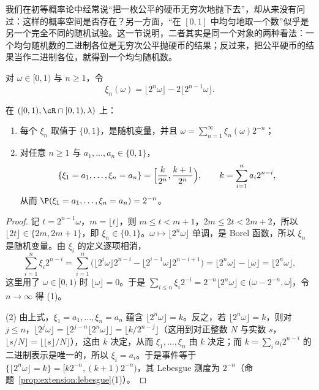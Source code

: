 我们在初等概率论中经常说“把一枚公平的硬币无穷次地抛下去”，却从来没有问过：这样的概率空间是否存在？另一方面，“在 $[0,1]$ 中均匀地取一个数”似乎是另一个完全不同的随机试验。这一节说明，二者其实是同一个对象的两种看法：一个均匀随机数的二进制各位是无穷次公平抛硬币的结果；反过来，把公平硬币的结果当作二进制各位，就得到一个均匀随机数。

对 $\omega\in[0,1)$ 与 $n\geqslant1$，令
\[
\xi_n(\omega)=\lfloor2^n\omega\rfloor-2\lfloor2^{n-1}\omega\rfloor .
\]

\begin{proposition}[均匀随机数的二进制各位]\label{prop:distributions:binary-digits}
在 $([0,1),\cR\cap[0,1),\lambda)$ 上：
\begin{enumerate}
\item 每个 $\xi_n$ 取值于 $\{0,1\}$，是随机变量，并且 $\omega=\sum_{n=1}^\infty\xi_n(\omega)2^{-n}$；
\item 对任意 $n\geqslant1$ 与 $a_1,\dots,a_n\in\{0,1\}$，
\[
\{\xi_1=a_1,\dots,\xi_n=a_n\}=\Bigl[\frac k{2^n},\frac{k+1}{2^n}\Bigr),\qquad k=\sum_{i=1}^na_i2^{n-i},
\]
从而 $\P(\xi_1=a_1,\dots,\xi_n=a_n)=2^{-n}$。
\end{enumerate}
\end{proposition}
\begin{proof}
记 $t=2^{n-1}\omega$，$m=\lfloor t\rfloor$，则 $m\leqslant t<m+1$，$2m\leqslant2t<2m+2$，所以 $\lfloor2t\rfloor\in\{2m,2m+1\}$，即 $\xi_n\in\{0,1\}$。$\omega\mapsto\lfloor2^n\omega\rfloor$ 单调，是 Borel 函数，所以 $\xi_n$ 是随机变量。由 $\xi_i$ 的定义逐项相消，
\[
\sum_{i=1}^n\xi_i2^{n-i}=\sum_{i=1}^n\bigl(\lfloor2^i\omega\rfloor2^{n-i}-\lfloor2^{i-1}\omega\rfloor2^{n-i+1}\bigr)=\lfloor2^n\omega\rfloor-\lfloor\omega\rfloor=\lfloor2^n\omega\rfloor,
\]
这里用了 $\omega\in[0,1)$ 时 $\lfloor\omega\rfloor=0$。于是 $\sum_{i\leqslant n}\xi_i2^{-i}=2^{-n}\lfloor2^n\omega\rfloor\in(\omega-2^{-n},\omega]$，令 $n\to\infty$ 得 (1)。

(2) 由上式，$\xi_1=a_1,\dots,\xi_n=a_n$ 蕴含 $\lfloor2^n\omega\rfloor=k$。反之，若 $\lfloor2^n\omega\rfloor=k$，则对 $j\leqslant n$，$\lfloor2^j\omega\rfloor=\lfloor2^{j-n}\lfloor2^n\omega\rfloor\rfloor=\lfloor k/2^{n-j}\rfloor$（这用到对正整数 $N$ 与实数 $s$，$\lfloor s/N\rfloor=\lfloor\lfloor s\rfloor/N\rfloor$），这由 $k$ 决定，从而 $\xi_1,\dots,\xi_n$ 由 $k$ 决定；而 $k=\sum_ia_i2^{n-i}$ 的二进制表示是唯一的，所以 $\xi_i=a_i$。于是事件等于 $\{\lfloor2^n\omega\rfloor=k\}=[k2^{-n},(k+1)2^{-n})$，其 Lebesgue 测度为 $2^{-n}$（命题~\ref{prop:extension:lebesgue}(1)）。
\end{proof}

